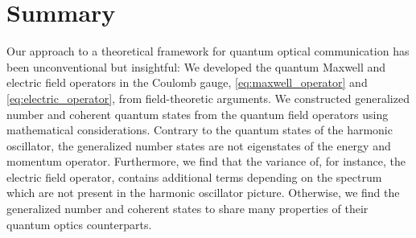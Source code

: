 \section*{Summary}

Our approach to a theoretical framework for quantum optical communication has been unconventional but insightful:
We developed the quantum Maxwell and electric field operators in the Coulomb gauge, \cref{eq:maxwell_operator} and \cref{eq:electric_operator}, from field-theoretic arguments.
We constructed generalized number and coherent quantum states from the quantum field operators using mathematical considerations.
Contrary to the quantum states of the harmonic oscillator, the generalized number states are not eigenstates of the energy and momentum operator.
Furthermore, we find that the variance of, for instance, the electric field operator, contains additional terms depending on the spectrum which are not present in the harmonic oscillator picture.
Otherwise, we find the generalized number and coherent states to share many properties of their quantum optics counterparts.

